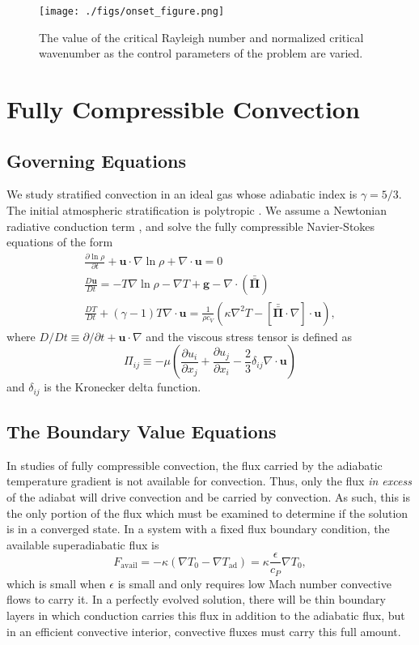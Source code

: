 \documentclass[titlepage, twocolumn, fontsize=10]{aastex6}
\newcommand{\Div}[1]{\ensuremath{\nabla\cdot\left( #1\right)}}
\newcommand{\DivU}{\ensuremath{\nabla\cdot\bm{u}}}
\newcommand{\grad}{\ensuremath{\nabla}}
\newcommand{\stressT}{\ensuremath{\bm{\bar{\bar{\Pi}}}}}
\begin{document}
\begin{figure}
\centering
\texttt{[image: ./figs/onset\_figure.png]}
\caption{The value of the critical Rayleigh number and normalized critical wavenumber
as the control parameters of the problem are varied. \label{fig:onset_curves}}
\end{figure}

\section{Fully Compressible Convection}

\subsection{Governing Equations}
We study stratified convection in an ideal gas whose adiabatic index is $\gamma = 5/3$.
The initial atmospheric stratification is polytropic \cite{anders&brown2017}.
We assume a Newtonian radiative conduction term \cite{lecoanet&all2014}, and solve the
fully compressible Navier-Stokes equations of the form
\begin{gather}
\frac{\partial \ln \rho}{\partial t} + \bm{u}\cdot\grad\ln\rho + \DivU = 0
	\label{eqn:FC_continuity}
\\
\frac{D \bm{u}}{Dt} = -T\grad\ln\rho - \grad T + \bm{g} - \Div{\stressT}
	\label{eqn:FC_momentum}
\\
\frac{D T}{D t} + (\gamma-1)T\DivU = 
\frac{1}{\rho c_V}\left(\kappa\grad^2 T - [\stressT\cdot\grad]\cdot\bm{u}\right),
	\label{eqn:FC_energy}
\end{gather}
where $D/Dt \equiv \partial/\partial t + \bm{u}\cdot\grad$ and the viscous stress
tensor is defined as
\begin{equation}
\Pi_{ij} \equiv -\mu\left(\frac{\partial u_i}{\partial x_j} + \frac{\partial u_j}{\partial x_i} - \frac{2}{3}\delta_{ij
}\DivU\right)
\label{eqn:stress_tensor}
\end{equation}
and $\delta_{ij}$ is the Kronecker delta function.

\subsection{The Boundary Value Equations}
In studies of fully compressible convection, the flux carried by the adiabatic temperature gradient
is not available for convection.  Thus, only the flux \emph{in excess} of the adiabat will drive
convection and be carried by convection.  As such, this is the only portion of the flux which
must be examined to determine if the solution is in a converged state.  In a system with
a fixed flux boundary condition, the available superadiabatic flux is
\begin{equation}
F_{\text{avail}} = -\kappa(\grad T_0 - \grad T_{\text{ad}}) = \kappa\frac{\epsilon}{c_P}\grad T_0,
\end{equation}
which is small when $\epsilon$ is small and only requires low Mach number convective flows
to carry it.  In a perfectly evolved solution, there will be thin boundary layers in which
conduction carries this flux in addition to the adiabatic flux, but in an efficient convective
interior, convective fluxes must carry this full amount.
\end{document}
